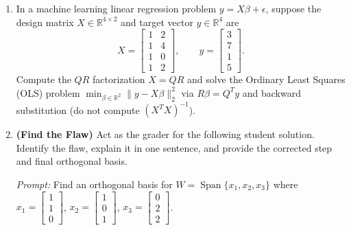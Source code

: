 \documentclass[11pt, letterpaper]{article}
\theoremstyle{definition}
\theoremstyle{remark}
\begin{document}
\begin{enumerate}[label=\textbf{Problem \arabic*.}, leftmargin=*, itemsep=0.9em]
    \item In a machine learning linear regression problem $y = X\beta + \epsilon$, suppose the design matrix $X \in \mathbb{R}^{4 \times 2}$ and target vector $y \in \mathbb{R}^4$ are
    \[
        X = \begin{bmatrix}
            1 & 2 \\
            1 & 4 \\
            1 & 0 \\
            1 & 2
        \end{bmatrix}, \qquad
        y = \begin{bmatrix}
            3 \\
            7 \\
            1 \\
            5
        \end{bmatrix}.
    \]
    Compute the $QR$ factorization $X = QR$ and solve the Ordinary Least Squares (OLS) problem $\min_{\beta \in \mathbb{R}^2} \|y - X\beta\|_2^2$ via $R\beta = Q^T y$ and backward substitution (do not compute $(X^T X)^{-1}$).

    \item \textbf{(Find the Flaw)} Act as the grader for the following student solution. Identify the flaw, explain it in one sentence, and provide the corrected step and final orthogonal basis.
    
    \emph{Prompt:} Find an orthogonal basis for $W = \operatorname{Span}\{x_1, x_2, x_3\}$ where $x_1 = \begin{bmatrix} 1 \\ 1 \\ 0 \end{bmatrix}$, $x_2 = \begin{bmatrix} 1 \\ 0 \\ 1 \end{bmatrix}$, $x_3 = \begin{bmatrix} 0 \\ 2 \\ 2 \end{bmatrix}$.
    

\end{enumerate}
\end{document}
